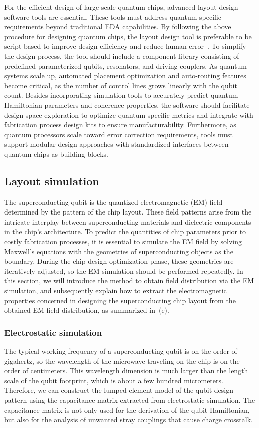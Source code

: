 \documentclass[a4paper,onecolumn,11pt,unpublished]{quantumarticle}
\begin{document}
For the efficient design of large-scale quantum chips, advanced layout design software tools are essential. These tools must address quantum-specific requirements beyond traditional EDA capabilities.
By following the above procedure for designing quantum chips, the layout design tool is preferable to be script-based to improve design efficiency and reduce human error~\cite{Cucurachi2021KQCircuits, Minev2021Qiskit}. To simplify the design process, the tool should include a component library consisting of predefined parameterized qubits, resonators, and driving couplers.
As quantum systems scale up, automated placement optimization and auto-routing features become critical, as the number of control lines grows linearly with the qubit count. Besides incorporating simulation tools to accurately predict quantum Hamiltonian parameters and coherence properties, the software should facilitate design space exploration to optimize quantum-specific metrics and integrate with fabrication process design kits to ensure manufacturability. Furthermore, as quantum processors scale toward error correction requirements, tools must support modular design approaches with standardized interfaces between quantum chips as building blocks.

\subsection{Layout simulation}
\label{sec:layout_simulation}
The superconducting qubit is the quantized electromagnetic (EM) field determined by the pattern of the chip layout. These field patterns arise from the intricate interplay between superconducting materials and dielectric components in the chip's architecture. To predict the quantities of chip parameters prior to costly fabrication processes, it is essential to simulate the EM field by solving Maxwell's equations with the geometries of superconducting objects as the boundary. During the chip design optimization phase, these geometries are iteratively adjusted, so the EM simulation should be performed repeatedly. In this section, we will introduce the method to obtain field distribution via the EM simulation, and subsequently explain how to extract the electromagnetic properties concerned in designing the superconducting chip layout from the obtained EM field distribution, as summarized in~(e).

\subsubsection{Electrostatic simulation}
The typical working frequency of a superconducting qubit is on the order of gigahertz, so the wavelength of the microwave traveling on the chip is on the order of centimeters.
This wavelength dimension is much larger than the length scale of the qubit footprint, which is about a few hundred micrometers. Therefore, we can construct the lumped-element model of the qubit design pattern using the capacitance matrix extracted from electrostatic simulation. The capacitance matrix is not only used for the derivation of the qubit Hamiltonian, but also for the analysis of unwanted stray couplings that cause charge crosstalk.  
\end{document}
